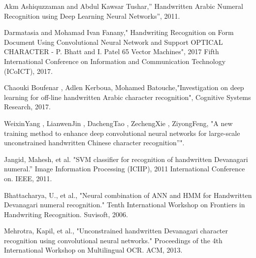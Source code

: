 \documentclass[a4paper,12pt]{report}
\begin{document}
\begin{thebibliography}{2}
Akm Ashiquzzaman and Abdul Kawsar Tushar,” Handwritten Arabic Numeral Recognition using Deep Learning Neural Networks”, 2011.

Darmatasia and Mohamad Ivan Fanany," Handwriting Recognition on Form Document Using Convolutional Neural Network and Support OPTICAL CHARACTER - P. Bhatt and I. Patel 65 Vector Machines", 2017 Fifth International Conference on Information and Communication Technology (ICoICT), 2017.


Chaouki Boufenar , Adlen Kerboua, Mohamed Batouche,"Investigation on deep learning for off-line handwritten Arabic character recognition", Cognitive Systems Research, 2017.

WeixinYang , LianwenJin , DachengTao , ZechengXie , ZiyongFeng, "A new training method to enhance deep convolutional neural networks for large-scale unconstrained handwritten Chinese character recognition”". 

Jangid, Mahesh, et al. "SVM classifier for recognition of handwritten Devanagari numeral.” Image Information Processing (ICIIP), 2011 International Conference on. IEEE, 2011. 

Bhattacharya, U., et al., "Neural combination of ANN and HMM for Handwritten Devanagari numeral recognition." Tenth International Workshop on Frontiers in Handwriting Recognition. Suvisoft, 2006. 

Mehrotra, Kapil, et al., "Unconstrained handwritten Devanagari character recognition using convolutional neural networks." Proceedings of the 4th International Workshop on Multilingual OCR. ACM, 2013. 



\end{thebibliography}
\end{document}
